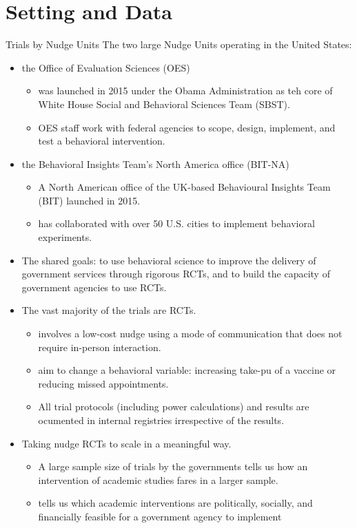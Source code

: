 \documentclass[dvipdfmx,11pt]{beamer}
\begin{document}
\section{Setting and Data}
\frame{\sectionpage}

\begin{frame}{Trials by Nudge Units}
  The two large Nudge Units operating in the United States:
  \begin{itemize}
    \item the Office of Evaluation Sciences (OES)
    \begin{itemize}
      \item was launched in 2015 under the Obama Administration as teh core of White House Social and Behavioral Sciences Team (SBST).
      \item OES staff work with federal agencies to scope, design, implement, and test a behavioral intervention.
    \end{itemize}
    \item the Behavioral Insights Team's North America office (BIT-NA)
    \begin{itemize}
      \item A North American office of the UK-based Behavioural Insights Team (BIT) launched in 2015.
      \item has collaborated with over 50 U.S. cities to implement behavioral experiments.
    \end{itemize}
    \item The shared goals: to use behavioral science to improve the delivery of government services through rigorous RCTs, and to build the capacity of government agencies to use RCTs.
  \end{itemize}
\end{frame}

\begin{frame}{}
  \begin{itemize}
    \item The vast majority of the trials are RCTs.
    \begin{itemize}
      \item involves a low-cost nudge using a mode of communication that does not require in-person interaction.
      \item aim to change a behavioral variable: increasing take-pu of a vaccine or reducing missed appointments.
      \item All trial protocols (including power calculations) and results are ocumented in internal registries irrespective of the results.
    \end{itemize}
    \item Taking nudge RCTs to scale in a meaningful way.
    \begin{itemize}
      \item A large sample size of trials by the governments tells us how an intervention of academic studies fares in a larger sample.
      \item tells us which academic interventions are politically, socially, and financially feasible for a government agency to implement 
    \end{itemize}
  \end{itemize}
\end{frame}
\end{document}
